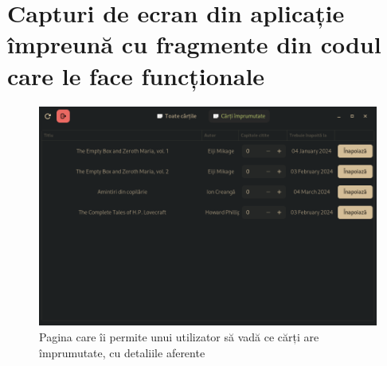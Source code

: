 \documentclass{article}
\begin{document}
    \section{Capturi de ecran din aplicație împreună cu fragmente din codul care le face funcționale}

    \begin{figure}[H]
        \includegraphics[width=\linewidth]{Borrowed-Books}
        \centering
        \caption{Pagina care îi permite unui utilizator să vadă ce cărți are împrumutate, cu detaliile aferente}
    \end{figure}
\end{document}
